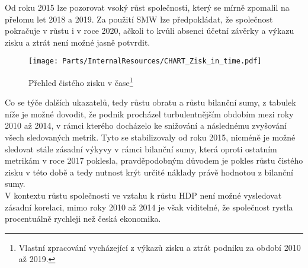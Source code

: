 Od roku 2015 lze pozorovat vsoký růst společnosti, který se mírně zpomalil na přelomu let 2018 a 2019. Za použití SMW lze předpokládat, že společnost pokračuje v růstu i v roce 2020,  ačkoli to kvůli absenci účetní závěrky a výkazu zisku a ztrát není možné jasně potvrdit.\\

\begin{figure}[!hbtp]
	\centering
	\texttt{[image: Parts/InternalResources/CHART\_Zisk\_in\_time.pdf]}
	\caption[Přehled čistého zisku v čase]{Přehled čistého zisku v čase\footnote{Vlastní zpracování vycházející z výkazů zisku a ztrát podniku za období 2010 až 2019.}}
	\label{fig:Prehled cisteho zisku v case}
\end{figure}

\newpage

Co se týče dalších ukazatelů, tedy růstu obratu a růstu bilanční sumy, z tabulek níže je možné dovodit, že podnik procházel turbulentnějším obdobím mezi roky 2010 až 2014, v rámci kterého docházelo ke snižování a následnému zvyšování všech sledovaných metrik. Tyto se stabilizovaly od roku 2015, nicméně je možné sledovat stále zásadní výkyvy v rámci bilanční sumy, která oproti ostatním metrikám v roce 2017 poklesla, pravděpodobným důvodem je pokles růstu čistého zisku v této době a tedy nutnost krýt určité náklady právě hodnotou z bilanční sumy.\\

V kontextu růstu společnosti ve vztahu k růstu HDP není možné vysledovat zásadní korelaci, mimo roky 2010 až 2014 je však viditelné, že společnost rystla procentuálně rychleji než česká ekonomika.\\

